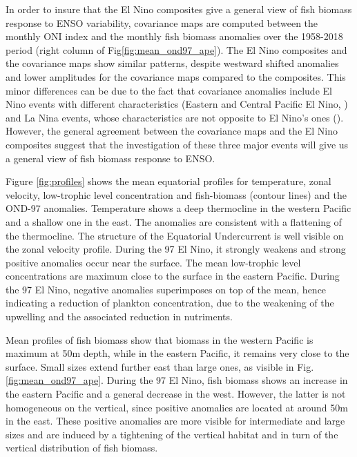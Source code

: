 In order to insure that the El Nino composites give a general view of fish biomass response to ENSO variability, covariance maps are computed between the monthly ONI index and the monthly fish biomass anomalies over the 1958-2018 period (right column of Fig\ref{fig:mean_ond97_ape}). The El Nino composites and the covariance maps show similar patterns, despite westward shifted anomalies and lower amplitudes for the covariance maps compared to the composites. This minor differences can be due to the fact that covariance anomalies include El Nino events with different characteristics (Eastern and Central Pacific El Nino, )  and La Nina events, whose characteristics are not opposite to El Nino's ones (). However, the general agreement between the covariance maps and the El Nino composites suggest that the investigation of these three major events will give us a general view of fish biomass response to ENSO.

Figure \ref{fig:profiles} shows the mean equatorial profiles for temperature, zonal velocity, low-trophic level concentration and fish-biomass (contour lines) and the OND-97 anomalies. Temperature shows a deep thermocline in the western Pacific and a shallow one in the east. The anomalies are consistent with a flattening of the thermocline. The structure of the Equatorial Undercurrent is well visible on the zonal velocity profile. During the 97 El Nino, it strongly weakens and strong positive anomalies occur near the surface. The mean low-trophic level concentrations are maximum close to the surface in the eastern Pacific. During the 97 El Nino, negative anomalies superimposes on top of the mean, hence indicating a reduction of plankton concentration, due to the weakening of the upwelling and the associated reduction in nutriments.

Mean profiles of fish biomass show that biomass in the western Pacific is maximum at 50m depth, while in the eastern Pacific, it remains very close to the surface. Small sizes extend further east than large ones, as visible in Fig.\ref{fig:mean_ond97_ape}. During the 97 El Nino, fish biomass shows an increase in the eastern Pacific and a general decrease in the west. However,  the latter is not homogeneous on the vertical, since positive anomalies are located at around 50m in the east. These positive anomalies are more visible for intermediate and large sizes and are induced by a tightening of the vertical habitat and in turn of the vertical distribution of fish biomass.


